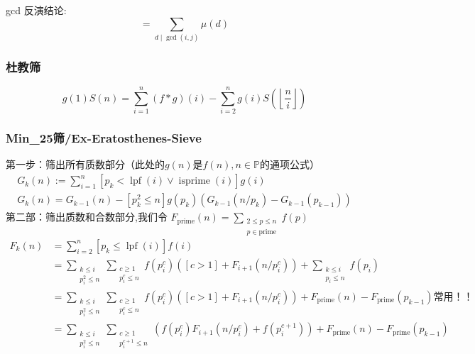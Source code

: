 gcd 反演结论:
\begin{equation*}
    [\operatorname{gcd}(i, j)=1]=\sum_{d \mid \operatorname{gcd}(i, j)} \mu(d)
\end{equation*}
\subsubsection{杜教筛}
\begin{equation*}
    g(1) S(n)=\sum_{i=1}^{n}(f * g)(i)-\sum_{i=2}^{n} g(i) S\left(\left\lfloor\frac{n}{i}\right\rfloor\right)
\end{equation*}
\subsubsection{Min\_25筛/Ex-Eratosthenes-Sieve}
第一步：筛出所有质数部分（此处的$g(n)$是$f(n),n\in \mathbb{P}$的通项公式）
\begin{equation*}
    \begin{array}{c}
        G_{k}(n):=\sum_{i=1}^{n}\left[p_{k}<\operatorname{lpf}(i) \vee \operatorname{isprime}(i)\right] g(i)\\
        G_{k}(n)=G_{k-1}(n)-\left[p_{k}^{2} \leq n\right] g\left(p_{k}\right)\left(G_{k-1}\left(n / p_{k}\right)-G_{k-1}\left(p_{k-1}\right)\right)
    \end{array}
\end{equation*}
第二部：筛出质数和合数部分,我们令 $F_{\text{prime}}(n)=\sum_{\substack{2\le p\le n\\ p\in \text{prime}}}f(p)$
\begin{equation*}
    \begin{aligned} 
        F_{k}(n) &= \sum_{i = 2}^{n} [p_{k} \le \operatorname{lpf}(i)] f(i) \ \\
        &= \sum_{\substack{k \le i \\ p_{i}^{2} \le n}} \sum_{\substack{c \ge 1 \\ p_{i}^{c} \le n}} f\left(p_{i}^{c}\right) ([c > 1] + F_{i + 1}\left(n / p_{i}^{c}\right)) + \sum_{\substack{k \le i \\ p_{i} \le n}} f(p_{i}) \ \\
        &{= \sum_{\substack{k \le i \\ p_{i}^{2} \le n}} \sum_{\substack{c \ge 1 \\ p_{i}^{c} \le n}} f\left(p_{i}^{c}\right) ([c > 1] + F_{i + 1}\left(n / p_{i}^{c}\right)) + F_{\mathrm{prime}}(n) - F_{\mathrm{prime}}(p_{k - 1})}\text{常用！！} \ \\
        &= \sum_{\substack{k \le i \\ p_{i}^{2} \le n}} \sum_{\substack{c \ge 1 \\ p_{i}^{c + 1} \le n}} \left(f\left(p_{i}^{c}\right) F_{i + 1}\left(n / p_{i}^{c}\right) + f\left(p_{i}^{c + 1}\right)\right) + F_{\mathrm{prime}}(n) - F_{\mathrm{prime}}(p_{k - 1}) 
    \end{aligned}
\end{equation*}

